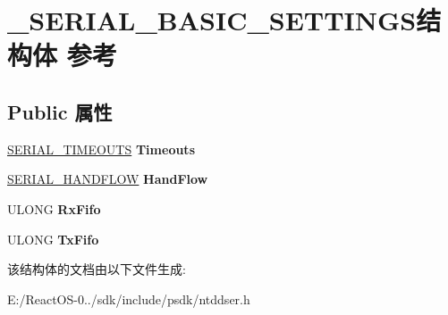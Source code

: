 \hypertarget{struct___s_e_r_i_a_l___b_a_s_i_c___s_e_t_t_i_n_g_s}{}\section{\+\_\+\+S\+E\+R\+I\+A\+L\+\_\+\+B\+A\+S\+I\+C\+\_\+\+S\+E\+T\+T\+I\+N\+G\+S结构体 参考}
\label{struct___s_e_r_i_a_l___b_a_s_i_c___s_e_t_t_i_n_g_s}
\subsection*{Public 属性}
\begin{DoxyCompactItemize}
\item 
\mbox{\label{struct___s_e_r_i_a_l___b_a_s_i_c___s_e_t_t_i_n_g_s_a5f61f81e943735c450b46fbee7474a97}} 
\hyperlink{struct___s_e_r_i_a_l___t_i_m_e_o_u_t_s}{S\+E\+R\+I\+A\+L\+\_\+\+T\+I\+M\+E\+O\+U\+TS} {\bfseries Timeouts}
\item 
\mbox{\label{struct___s_e_r_i_a_l___b_a_s_i_c___s_e_t_t_i_n_g_s_acf5c0d622fbaa4c7d085f0d860f84eff}} 
\hyperlink{struct___s_e_r_i_a_l___h_a_n_d_f_l_o_w}{S\+E\+R\+I\+A\+L\+\_\+\+H\+A\+N\+D\+F\+L\+OW} {\bfseries Hand\+Flow}
\item 
\mbox{\label{struct___s_e_r_i_a_l___b_a_s_i_c___s_e_t_t_i_n_g_s_ab8acab3ef97a9eb9ead86fdc8043dab0}} 
U\+L\+O\+NG {\bfseries Rx\+Fifo}
\item 
\mbox{\label{struct___s_e_r_i_a_l___b_a_s_i_c___s_e_t_t_i_n_g_s_af6004243f6571e4244170dfe4c8c2d1b}} 
U\+L\+O\+NG {\bfseries Tx\+Fifo}
\end{DoxyCompactItemize}


该结构体的文档由以下文件生成\+:\begin{DoxyCompactItemize}
\item 
E\+:/\+React\+O\+S-\/0../sdk/include/psdk/ntddser.\+h\end{DoxyCompactItemize}

